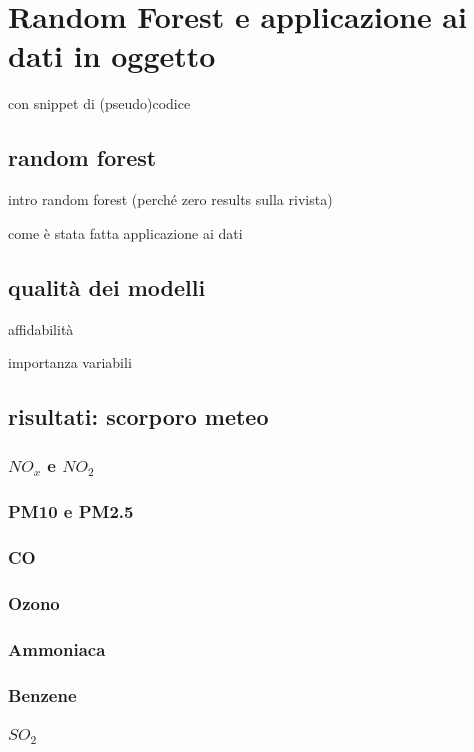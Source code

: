 \section{Random Forest e applicazione ai dati in oggetto}

con snippet di (pseudo)codice

\subsection{random forest}
intro random forest (perché zero results sulla rivista)



come è stata fatta applicazione ai dati


\subsection{qualità dei modelli}

affidabilità

importanza variabili

\subsection{risultati: scorporo meteo}

\subsubsection{$NO_x$ e $NO_2$}
\subsubsection{PM10 e PM2.5}
\subsubsection{CO}
\subsubsection{Ozono}
\subsubsection{Ammoniaca}
\subsubsection{Benzene}
\subsubsection{$SO_2$}



